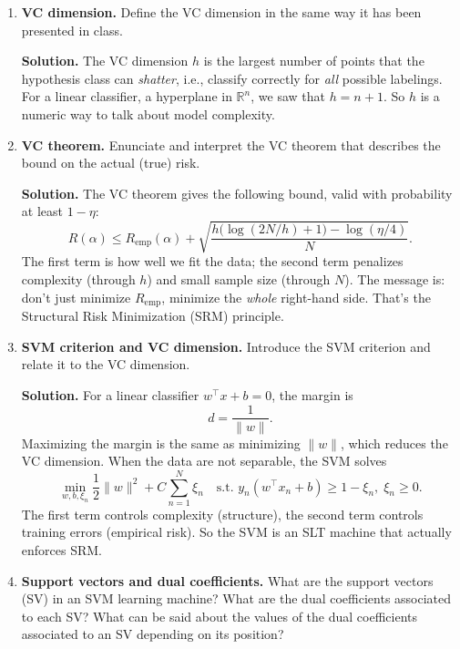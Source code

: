 \documentclass[11pt]{article}
\begin{document}
\begin{enumerate}
		\vspace{1em}
		
		\item \textbf{VC dimension.} Define the VC dimension in the same way it has been presented in class.
		
		\noindent\textbf{Solution.}
		The VC dimension $h$ is the largest number of points that the hypothesis class can \emph{shatter}, i.e., classify correctly for \emph{all} possible labelings. For a linear classifier, a hyperplane in $\mathbb{R}^n$, we saw that $h = n + 1$. So $h$ is a numeric way to talk about model complexity.
		
		\vspace{1em}
		
		\item \textbf{VC theorem.} Enunciate and interpret the VC theorem that describes the bound on the actual (true) risk.
		
		\noindent\textbf{Solution.}
		The VC theorem gives the following bound, valid with probability at least $1 - \eta$:
		\[
		R(\alpha) \le R_{\text{emp}}(\alpha) +
		\sqrt{\frac{h\big(\log(2N/h) + 1\big) - \log(\eta/4)}{N}}.
		\]
		The first term is how well we fit the data; the second term penalizes complexity (through $h$) and small sample size (through $N$). The message is: don’t just minimize $R_{\text{emp}}$, minimize the \emph{whole} right-hand side. That’s the Structural Risk Minimization (SRM) principle.
		
		\vspace{1em}
		
		\item \textbf{SVM criterion and VC dimension.} Introduce the SVM criterion and relate it to the VC dimension.
		
		\noindent\textbf{Solution.}
		For a linear classifier $w^\top x + b = 0$, the margin is
		\[
		d = \frac{1}{\|w\|}.
		\]
		Maximizing the margin is the same as minimizing $\|w\|$, which reduces the VC dimension. When the data are not separable, the SVM solves
		\[
		\min_{w,b,\xi_n} \frac{1}{2}\|w\|^2 + C \sum_{n=1}^N \xi_n
		\quad \text{s.t. } y_n(w^\top x_n + b) \ge 1 - \xi_n,\; \xi_n \ge 0.
		\]
		The first term controls complexity (structure), the second term controls training errors (empirical risk). So the SVM is an SLT machine that actually enforces SRM.
		
		\vspace{1em}
		
		\item \textbf{Support vectors and dual coefficients.} What are the support vectors (SV) in an SVM learning machine? What are the dual coefficients associated to each SV? What can be said about the values of the dual coefficients associated to an SV depending on its position?
		

\end{enumerate}
\end{document}
